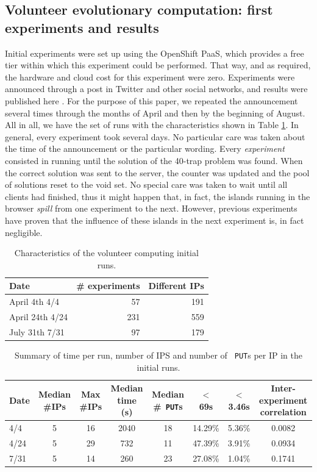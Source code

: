 \documentclass[journal,onecolumn]{IEEEtran}
\begin{document}
\subsection{Volunteer evolutionary computation: first experiments and results}

Initial experiments were set up using the OpenShift
PaaS, which provides a free tier within which this 
experiment could be performed. That way, and as required, the hardware
and cloud cost for this experiment were zero. Experiments were
announced through a post in Twitter and other social networks, and
results were published here \cite{DBLP:conf/gecco/GuervosG15}. For the
purpose of this paper, we repeated the announcement several times
through the months of April and then by the beginning of August. All
in all, we have the set of runs with the characteristics shown in
Table \ref{tab:runs}. In general, every experiment took several
days. No particular care was taken about the time of the announcement
or the particular wording. Every {\em experiment} consisted in running
until the solution of the 40-trap problem was found. When the correct
solution was sent to the server, the counter was updated and the pool
of solutions reset to the void set. No special care was taken to wait
until all clients had finished, thus it might happen that, in fact,
the islands running in the browser {\em spill} from one experiment to
the next. However, previous experiments have proven that the influence
of these islands in the next experiment is, in fact negligible.
%
\begin{table}
\caption{Characteristics of the volunteer computing initial runs. \label{tab:runs}}
\begin{center}
\begin{tabular}{l|rr}
\hline
Date & \# experiments & Different IPs \\
\hline
April 4th 4/4 & 57 & 191 \\
April 24th 4/24 &  231 & 559 \\
July 31th 7/31 & 97 & 179 \\
\hline
\end{tabular}
\end{center}
\end{table}
%
\begin{table}
\caption{Summary of time per run, number of IPS and number of {\tt
    PUT}s per IP in the initial runs. \label{tab:summary:os}}
\begin{center}
\begin{tabular}{l|ccccccc}
\hline
Date & Median \#IPs & Max \#IPs & Median time (s) & Median \#{\tt
  PUT}s & $<$ 69s & $<$ 3.46s & Inter-experiment correlation\\
\hline
4/4 & 5 & 16 & 2040 & 18 & 14.29\% & 5.36\% & 0.0082 \\
4/24 &  5 & 29 & 732 & 11 & 47.39\% & 3.91\% & 0.0934\\
7/31 & 5 & 14 & 260 & 23 & 27.08\% & 1.04\%  & 0.1741\\
\hline
\end{tabular}
\end{center}
\end{table}
\end{document}
